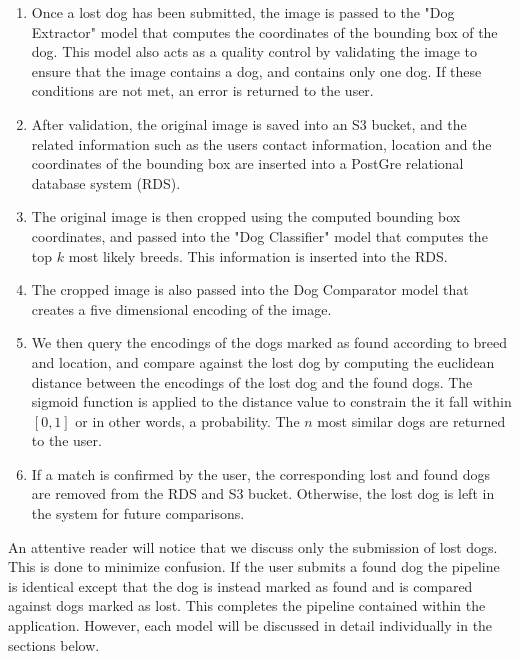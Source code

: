 \documentclass{article}
\begin{document}
\begin{enumerate}
  
  \item Once a lost dog has been submitted, the image is passed to the "Dog Extractor" model that computes the coordinates of the bounding box of the dog.  This model also acts as a quality control by validating the image to ensure that the image contains a dog, and contains only one dog.  If these conditions are not met, an error is returned to the user.
  
  \item After validation, the original image is saved into an S3 bucket, and the related information such as the users contact information, location and the coordinates of the bounding box are inserted into a PostGre relational database system (RDS).
  
  \item The original image is then cropped using the computed bounding box coordinates, and passed into the "Dog Classifier" model that computes the top $k$ most likely breeds.  This information is inserted into the RDS.
  
  \item The cropped image is also passed into the Dog Comparator model that creates a five dimensional encoding of the image.
  
  \item We then query the encodings of the dogs marked as found according to breed and location, and compare against the lost dog by computing the euclidean distance between the encodings of the lost dog and the found dogs.  The sigmoid function is applied to the distance value to constrain the it fall within $[0,1]$ or in other words, a probability.  The $n$ most similar dogs are returned to the user.
  
  \item If a match is confirmed by the user, the corresponding lost and found dogs are removed from the RDS and S3 bucket.  Otherwise, the lost dog is left in the system for future comparisons.
  
\end{enumerate}



An attentive reader will notice that we discuss only the submission of lost dogs.  This is done to minimize confusion.  If the user submits a found dog the pipeline is identical except that the dog is instead marked as found and is compared against dogs marked as lost.  This completes the pipeline contained within the application.  However, each model will be discussed in detail individually in the sections below.
\end{document}
